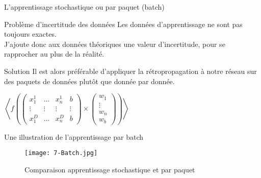 \begin{frame}{L'apprentissage stochastique ou par paquet (batch)}
    \begin{alertblock}{Problème d'incertitude des données}
        Les données d'apprentissage ne sont pas toujours exactes. \\
        J'ajoute donc aux données théoriques une valeur d'incertitude, pour se rapprocher au plus de la réalité. 
    \end{alertblock}
    \begin{exampleblock}{Solution}
        Il est alors préférable d'appliquer la rétropropagation à notre réseau sur des paquets de données plutôt que donnée par donnée. 
    \end{exampleblock}
    \begin{center}
        \centering
        $
            \left< f
            \left(
            \begin{pmatrix}
                    x_1^{1} & \ldots & x_n^{1} & b      \\
                    \vdots  & \vdots & \vdots  & \vdots \\
                    x_1^{D} & \ldots & x_n^{D} & b
                \end{pmatrix}
            \times
            \begin{pmatrix}
                    w_1    \\
                    \vdots \\
                    w_n    \\
                    w_b
                \end{pmatrix}
            \right) \right>
        $
    \end{center}
\end{frame}


\begin{frame}{Une illustration de l'apprentissage par batch}
    \begin{figure}
        \centering
        \texttt{[image: 7-Batch.jpg]}
        \caption{Comparaison apprentissage stochastique et par paquet}
    \end{figure}
\end{frame}
